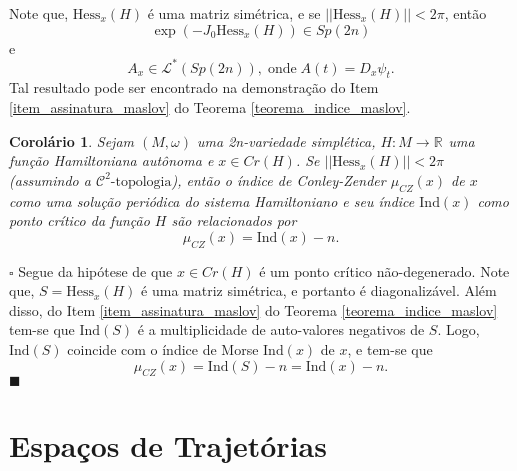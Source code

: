 \documentclass[12pt]{book}
\newtheorem{corolario}[teorema]{Corolário}
\newenvironment{prova}[1]{$\square$ #1}{\hfill$\blacksquare$}
\newcommand{\caminhosespeciais}[1]{\mathcal{L}^{*}(#1)}
\newcommand{\cktopologia}[1]{\mathcal{C}^{#1}\text{-topologia}}
\newcommand{\estruturacomplexa}{J_{0}}
\newcommand{\gruposimpletico}[1]{Sp(#1)}
\newcommand{\hessianaponto}[2]{\text{Hess}_{#1}(#2)}
\newcommand{\iconley}[1]{\iconleyabrev(#1)}
\newcommand{\iconleyabrev}{\mu_{CZ}}
\newcommand{\ind}{\text{Ind}}
\newcommand{\norma}[1]{||#1||}
\newcommand{\pontoscriticos}[1]{\textit{Cr}(#1)}
\newcommand{\real}[1]{\mathbb{R}^{#1}}
\newcommand{\reta}{\real{}}
\begin{document}
	Note que, $\hessianaponto{x}{H}$ é uma matriz simétrica, e se $\norma{\hessianaponto{x}{H}}<2\pi$, então 
	$$
	\exp(-\estruturacomplexa \hessianaponto{x}{H}) \in \gruposimpletico{2n}
	$$
	e
	$$ 
	A_{x}\in \caminhosespeciais{\gruposimpletico{2n}},\;\text{onde}\; A(t) = D_{x}\psi_{t}.
	$$ 
	Tal resultado pode ser encontrado na demonstração do Item \ref{item_assinatura_maslov} do Teorema \ref{teorema_indice_maslov}.
	
	\begin{corolario}
		Sejam $(M,\omega)$ uma 2n-variedade simplética, $H:M\to \reta$ uma função Hamiltoniana autônoma e $x \in \pontoscriticos{H}$. Se $\norma{\hessianaponto{x}{H}}<2\pi$ (assumindo a $\cktopologia{2}$), então o índice de Conley-Zender $\iconley{x}$ de $x$ como uma solução periódica do sistema Hamiltoniano e seu índice $\ind(x)$ como ponto crítico da função $H$ são relacionados por
		$$
		\iconley{x} = \ind(x)-n.
		$$
	\end{corolario}
	\begin{prova}
		Segue da hipótese de que $x\in \pontoscriticos{H}$ é um ponto crítico não-degenerado. Note que, $S=\hessianaponto{x}{H}$ é uma matriz simétrica, e portanto é diagonalizável. Além disso, do Item \ref{item_assinatura_maslov} do Teorema \ref{teorema_indice_maslov} tem-se que $\ind(S)$ é a multiplicidade de auto-valores negativos de $S$. Logo, $\ind(S)$ coincide com o índice de Morse $\ind(x)$ de $x$, e tem-se que
		$$
		\iconley{x} = \ind(S)-n = \ind(x)-n.
		$$
	\end{prova}
	
	\chapter{Espaços de Trajetórias}\label{apendice_variedades_banach}
	
\end{document}

